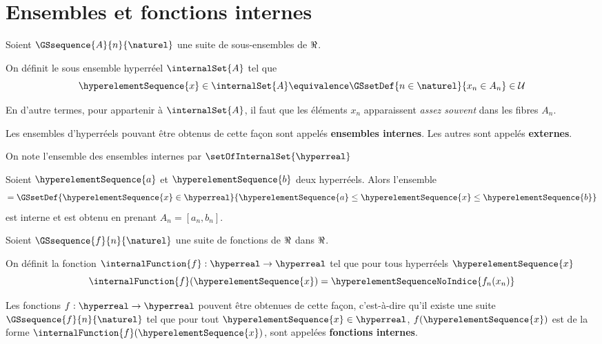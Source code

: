 \section{Ensembles et fonctions internes}

\begin{definition} 
	Soient $\GSsequence{A}{n}{\naturel}$ une suite de sous-ensembles de $\real$.

	On définit le sous ensemble hyperréel $\internalSet{A}$
	tel que
	\begin{equation}
		\hyperelementSequence{x} \in \internalSet{A} \equivalence \GSsetDef{n \in
		\naturel}{x_{n} \in A_{n}} \in \mathcal{U}
	\end{equation}

	En d'autre termes, pour appartenir à $\internalSet{A}$, il faut que les
	éléments $x_{n}$ apparaissent \textit{assez souvent} dans les fibres $A_{n}$.

	Les ensembles d'hyperréels pouvant être obtenus de cette façon sont appelés
	\textbf{ensembles internes}. Les autres sont appelés \textbf{externes}.

	On note l'ensemble des ensembles internes par $\setOfInternalSet{\hyperreal}$

\end{definition}

\begin{exemple}
	Soient $\hyperelementSequence{a}$ et $\hyperelementSequence{b}$ deux hyperréels. Alors l'ensemble
	\begin{equation}
		[ \hyperelementSequence{a}, \hyperelementSequence{b} ] =
		\GSsetDef{\hyperelementSequence{x} \in
	\hyperreal}{\hyperelementSequence{a} \leq \hyperelementSequence{x} \leq
	\hyperelementSequence{b}}
	\end{equation}
	est interne et est obtenu en prenant $A_{n} = [a_{n}, b_{n}]$.
\end{exemple}

\begin{definition} 
	Soient $\GSsequence{f}{n}{\naturel}$ une suite de fonctions de $\real$ dans
	$\real$.

	On définit la fonction $\internalFunction{f} : \hyperreal \rightarrow
	\hyperreal$ tel que pour tous hyperréels $\hyperelementSequence{x}$
	\begin{equation}
		\internalFunction{f}(\hyperelementSequence{x}) =
		\hyperelementSequenceNoIndice{f_{n}(x_{n})}
	\end{equation}

	Les fonctions $f : \hyperreal \rightarrow \hyperreal$ pouvent être obtenues
	de cette façon, c'est-à-dire qu'il existe une suite
	$\GSsequence{f}{n}{\naturel}$ tel que pour tout $\hyperelementSequence{x}
	\in \hyperreal$,
	$f(\hyperelementSequence{x})$ est de la forme
	$\internalFunction{f}(\hyperelementSequence{x})$, sont appelées
	\textbf{fonctions internes}.
\end{definition}

